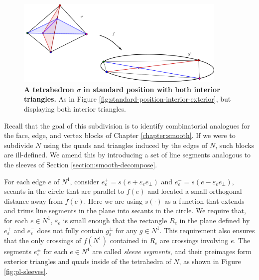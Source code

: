 \begin{figure}[h!]
	\centering
	\includegraphics[width=0.9\textwidth]{figures/standard-position-interior-interior.png}
	\caption{
		\textbf{A tetrahedron $\sigma$ in standard position with both interior triangles.}
		As in Figure \ref{fig:standard-position-interior-exterior}, but displaying both interior triangles.
	}
	\label{fig:standard-position-interior-interior}
\end{figure}

Recall that the goal of this subdivision is to identify combinatorial analogues for the face, edge, and vertex blocks of Chapter \ref{chapter:smooth}.
If we were to subdivide $N$ using the quads and triangles induced by the edges of $N$, such blocks are ill-defined.
We amend this by introducing a set of line segments analogous to the sleeves of Section \ref{section:smooth-decompose}.

For each edge $e$ of $N^1$, consider $e_\varepsilon^+ = s(e+\varepsilon_e e_\perp)$ and $e_\varepsilon^- =s(e-\varepsilon_e e_\perp)$, secants in the circle that are parallel to $f(e)$ and located a small orthogonal distance away from $f(e)$.
Here we are using $s(\cdot)$ as a function that extends and trims line segments in the plane into secants in the circle.
We require that, for each $e\in N^1$, $\varepsilon_e$ is small enough that the rectangle $R_e$ in the plane defined by $e_\varepsilon^+$ and $e_\varepsilon^-$ does not fully contain $g_\varepsilon^\pm$ for any $g\in N^1$.
This requirement also ensures that the only crossings of $f(N^1)$ contained in $R_e$ are crossings involving $e$.
The segments $e_\varepsilon^\pm$ for each $e\in N^1$ are called \emph{sleeve segments}, and their preimages form exterior triangles and quads inside of the tetrahedra of $N$, as shown in Figure \ref{fig:pl-sleeves}.

